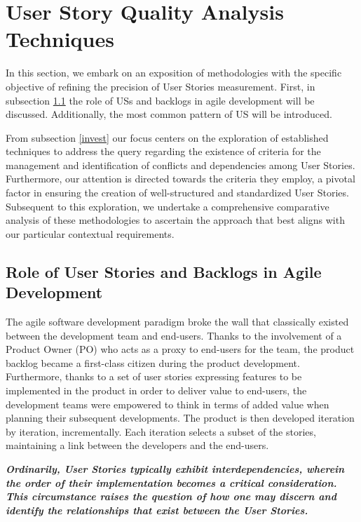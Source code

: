 \section{User Story Quality Analysis Techniques}\label{usq}
In this section, we embark on an exposition of methodologies with the specific objective of refining the precision of User Stories measurement. First, in subsection \ref{us} the role of USs and backlogs in agile development will be discussed. Additionally, the most common pattern of US will be introduced.

From subsection \ref{invest} our focus centers on the exploration of established techniques to address the query regarding the existence of criteria for the management and identification of conflicts and dependencies among User Stories. Furthermore, our attention is directed towards the criteria they employ, a pivotal factor in ensuring the creation of well-structured and standardized User Stories. Subsequent to this exploration, we undertake a comprehensive comparative analysis of these methodologies to ascertain the approach that best aligns with our particular contextual requirements.
\subsection{Role of User Stories and Backlogs in Agile Development} \label{us}
The agile software development paradigm broke the wall that classically existed between the development team and end-users. Thanks to the involvement of a Product Owner (PO) who acts as a proxy to end-users for the team, the product backlog \cite{sedano2019product} became a ﬁrst-class citizen during the product development. Furthermore, thanks to a set of user stories expressing features to be implemented in the product in order to deliver value to end-users, the development teams were empowered to think in terms of added value when planning their subsequent developments. The product is then developed iteration by iteration, incrementally. Each iteration selects a subset of the stories, maintaining a link between the developers and the end-users\cite{mosser2022modelling}. 

\textbf{\emph{Ordinarily, User Stories typically exhibit interdependencies, wherein the order of their implementation becomes a critical consideration. This circumstance raises the question of how one may discern and identify the relationships that exist between the User Stories.}}

